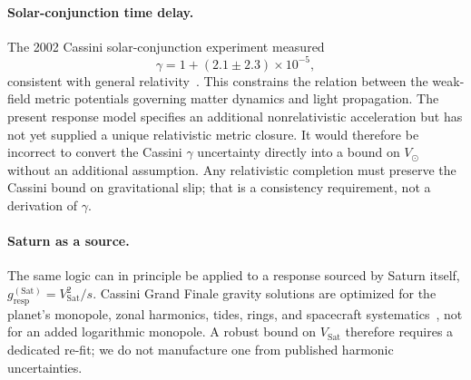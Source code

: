 \documentclass[11pt]{article}
\theoremstyle{definition}
\theoremstyle{remark}
\begin{document}
\paragraph{Solar-conjunction time delay.}
The 2002 Cassini solar-conjunction experiment measured
\begin{equation}
\gamma=1+(2.1\pm2.3)\times10^{-5},
\end{equation}
consistent with general relativity~\cite{Bertotti2003}.
This constrains the relation between the weak-field metric potentials governing matter dynamics and light propagation.
The present response model specifies an additional nonrelativistic acceleration but has not yet supplied a unique relativistic metric closure.
It would therefore be incorrect to convert the Cassini $\gamma$ uncertainty directly into a bound on $V_\odot$ without an additional assumption.
Any relativistic completion must preserve the Cassini bound on gravitational slip; that is a consistency requirement, not a derivation of $\gamma$.

\paragraph{Saturn as a source.}
The same logic can in principle be applied to a response sourced by Saturn itself, $g_{\mathrm{resp}}^{(\mathrm{Sat})}=V_{\mathrm{Sat}}^{2}/s$.
Cassini Grand Finale gravity solutions are optimized for the planet's monopole, zonal harmonics, tides, rings, and spacecraft systematics~\cite{Iess2019}, not for an added logarithmic monopole.
A robust bound on $V_{\mathrm{Sat}}$ therefore requires a dedicated re-fit; we do not manufacture one from published harmonic uncertainties.
\end{document}
